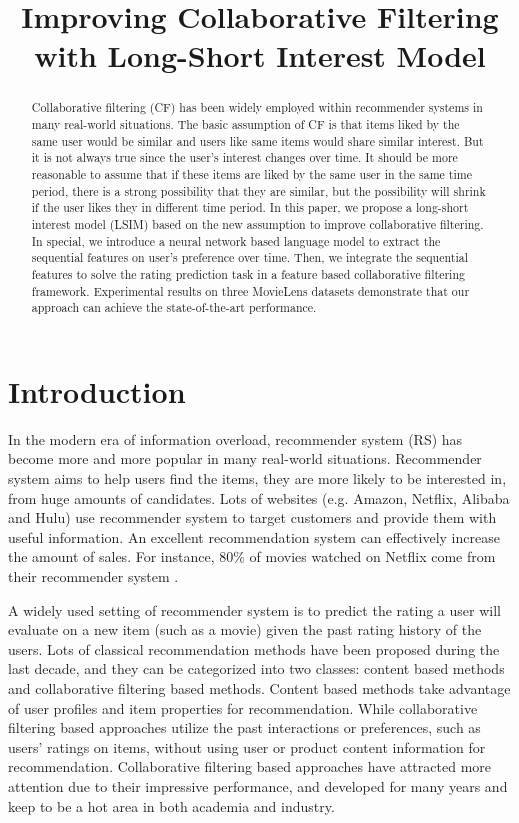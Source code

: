 \documentclass{llncs}
\begin{document}
%
\title{Improving Collaborative Filtering with Long-Short Interest Model}
%
\maketitle
%
\begin{abstract}
Collaborative filtering (CF) has been widely employed within
recommender systems in many real-world situations.
The basic assumption of CF is that items liked by the same user would be similar and
users like same items would share similar interest.
But it is not always true since the user's interest changes over time.
It should be more reasonable to assume that
if these items are liked by the same user in the same time period,
there is a strong possibility that they are similar,
but the possibility will shrink if the user likes they in different time period.
In this paper, we propose a long-short interest model (LSIM) based on
the new assumption to improve collaborative filtering.
In special, we introduce a neural network based language model
to extract the sequential features on user's preference over time.
Then, we integrate the sequential features to solve the rating prediction task
in a feature based collaborative filtering framework.
Experimental results on three MovieLens datasets demonstrate that
our approach can achieve the state-of-the-art performance.
\end{abstract}
%
\section{Introduction}
In the modern era of information overload,
recommender system (RS) has become more and more popular in many real-world situations.
Recommender system aims to help users find the items,
they are more likely to be interested in,
from huge amounts of candidates.
Lots of websites (e.g. Amazon, Netflix, Alibaba and Hulu) use recommender system to
target customers and provide them with useful information.
An excellent recommendation system can effectively increase the amount of sales.
For instance, 80\% of movies watched on Netflix
come from their recommender system \cite{gomez2015netflix}.

A widely used setting of recommender system \cite{ricci2011introduction} is to
predict the rating a user will evaluate on a new item (such as a movie)
given the past rating history of the users.
Lots of classical recommendation methods have been proposed
during the last decade, and they can be categorized into two classes:
content based methods and collaborative filtering based methods.
Content based methods \cite{pazzani2007content} take advantage of
user profiles and item properties for recommendation.
While collaborative filtering based approaches \cite{su2009survey} utilize
the past interactions or preferences, such as users' ratings on items,
without using user or product content information for recommendation.
Collaborative filtering based approaches have attracted more attention
due to their impressive performance, and developed for many years and
keep to be a hot area in both academia and industry.
\end{document}
